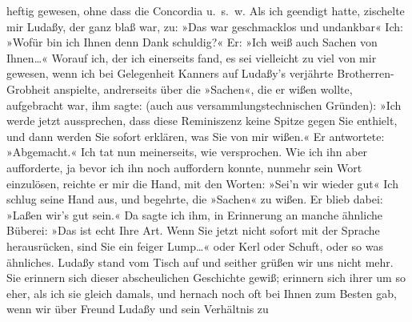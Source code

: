 \begin{ledgroupsized}[t]{13cm}
               heftig gewesen, ohne dass die Concordia u. s. w.
               Als ich geendigt hatte, zischelte mir Ludaßy,
               der ganz blaß war, zu: »Das war geschmacklos und undankbar{\dotstwo}« Ich: »Wofür bin ich Ihnen denn Dank schuldig?« Er: »Ich weiß auch Sachen von
                  Ihnen{\dots}« Worauf ich, der ich einerseits fand, es sei
               vielleicht zu viel von mir gewesen, wenn ich bei Gelegenheit Kanners auf Ludaßy’s
               verjährte Brotherren-Grobheit anspielte, andrerseits über die »Sachen«, die er wißen
               wollte, aufgebracht war, ihm sagte: (auch aus versammlungstechnischen Gründen): »Ich
               werde jetzt aussprechen, dass diese Reminiszenz keine Spitze gegen Sie enthielt, und
               dann werden Sie sofort erklären, was Sie von mir wißen.« Er antwortete: »Abgemacht.«
               Ich tat nun meinerseits, wie versprochen. Wie ich ihn aber aufforderte, ja bevor ich
               ihn noch auffordern konnte, nunmehr sein Wort einzulösen, reichte er mir die Hand,
               mit den Worten: »Sei’n wir wieder gut{\dotstwo}« Ich schlug seine
               Hand aus, und begehrte, die »Sachen« zu wißen. Er blieb dabei: »Laßen wir’s gut
               sein.« Da sagte ich ihm, in Erinnerung an manche ähnliche Büberei: »Das ist echt Ihre
               Art. Wenn Sie jetzt nicht sofort mit {\pb}der Sprache herausrücken, sind
               Sie ein feiger Lump{\dots}« oder Kerl {\dotstwo} oder Schuft, oder so was ähnliches. Ludaßy
               stand vom Tisch auf und seither grüßen wir uns nicht mehr.\pend
           \pstart
           Sie erinnern sich dieser abscheulichen Geschichte gewiß; erinnern sich ihrer um so
               eher, als ich sie gleich damals, und hernach noch oft bei Ihnen zum Besten gab, wenn
               wir über Freund Ludaßy und sein Verhältnis zu

\end{ledgroupsized}

